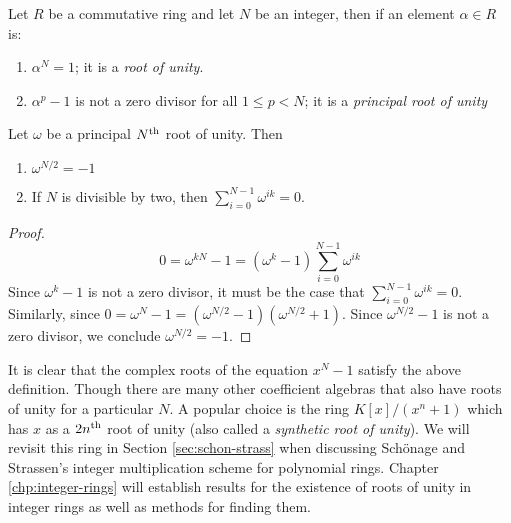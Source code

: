 \begin{definition}
  Let $R$ be a commutative ring and let $N$ be an integer, then if an element $\alpha \in R$ is: 
  \begin{enumerate}
      \item $\alpha^N = 1$; it is a \textit{root of unity}.
      \item $\alpha^p - 1$ is not a zero divisor for all $1 \leq p < N$; it is a \textit{principal root of unity}
  \end{enumerate}
\end{definition}

\begin{lemma}\label{lem:rou-results}
    Let $\omega$ be a principal $N^{\textrm{th}}$ root of unity. Then 
    \begin{enumerate}
        \item $\omega^{N/2} = -1$
        \item If $N$ is divisible by two, then $\sum_{i = 0}^{N-1} \omega^{ik} = 0$.
    \end{enumerate}
\end{lemma}
\begin{proof}
    \[
        0 = \omega^{kN} - 1 = (\omega^k - 1)\sum^{N-1}_{i=0} \omega^{ik}
    \]
    Since $\omega^k - 1$ is not a zero divisor, it must be the case that $\sum^{N-1}_{i=0} \omega^{ik} = 0$.
    Similarly, since $0 = \omega^N - 1 = (\omega^{N/2} - 1)(\omega^{N/2} + 1)$. Since $\omega^{N/2} - 1$ is not a zero divisor, we conclude $\omega^{N/2} = -1$.
\end{proof}

It is clear that the complex roots of the equation $x^N - 1$ satisfy the above definition. Though there are many other coefficient algebras that also have roots of unity for a particular $N$. A popular choice is the ring $K[x]/(x^n + 1)$ which has $x$ as a $2n^{\textrm{th}}$ root of unity (also called a \textit{synthetic root of unity}). We will revisit this ring in Section \ref{sec:schon-strass} when discussing Sch\"{o}nage and Strassen's integer multiplication scheme for polynomial rings. Chapter \ref{chp:integer-rings} will establish results for the existence of roots of unity in integer rings as well as methods for finding them. 

